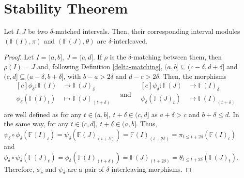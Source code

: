 \newpage
\section{Stability Theorem}

\begin{lemma} \label{interval-interleaving-if-matching} %
    Let $ I, J $ be two $\delta$-matched intervals. Then, their corresponding interval modules $ (\mathbb F (I), \pi) $ and $( \mathbb F (J), \theta) $ are $\delta$-interleaved.
\end{lemma}
\begin{proof}
    Let $ I = (a, b] $, $ J = (c, d] $. If $\rho$ is the $\delta$-matching between them, then $ \rho(I) = J $ and, following Definition \ref{delta-matching}, $ (a, b] \subseteq (c-\delta, d+\delta] $ and $ (c, d] \subseteq (a-\delta, b+\delta] $, with $ b - a > 2\delta $ and $ d - c > 2\delta $. Then, the morphisms
    \begin{equation*}
        \begin{aligned}[c]
        \phi_\delta: \mathbb F(I) &\to \mathbb F(J)_\delta\\
        \phi_\delta(\mathbb F(I)_t) &\mapsto \mathbb F(J)_{(t+\delta)}\\
        \end{aligned}
        \quad \text{and} \quad
        \begin{aligned}[c]
        \psi_\delta: \mathbb F(J) &\to \mathbb F(I)_\delta\\
        \psi_\delta(\mathbb F(J)_t) &\mapsto \mathbb F(I)_{(t+\delta)}\\
        \end{aligned}
    \end{equation*}
    are well defined as for any $ t \in (a,b], \ t + \delta \in (c, d] $ as $ a + \delta > c $ and $ b + \delta \leq d $. In the same way, for any $ t \in (c,d], \ t + \delta \in (a, b] $. Thus, $ \psi_\delta \circ \phi_\delta (\mathbb F(I)_t) = \psi_\delta(\mathbb F(J)_{(t+\delta)}) = \mathbb F(I)_{(t+2\delta)} = \pi_{t \leq t+2\delta}(\mathbb F(I)_t)$ and $ \phi_\delta \circ \psi_\delta (\mathbb F(J)_t) = \phi_\delta(\mathbb F(I)_{(t+\delta)}) = \mathbb F(J)_{(t+2\delta)} = \theta_{t \leq t+2\delta}(\mathbb F(J)_t)$. Therefore, $ \phi_\delta $ and $ \psi_\delta $ are a pair of $\delta$-interleaving morphisms.
\end{proof}

